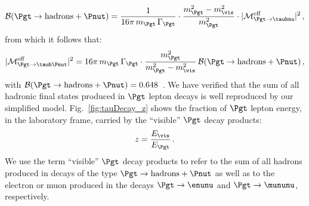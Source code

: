 \begin{equation}
\mathcal{B}(\Pgt \to \textrm{hadrons} + \Pnut) = \frac{1}{16 \pi \, m_{\Pgt} \, \Gamma_{\Pgt}} \cdot \frac{m_{\Pgt}^{2} - m_{\vis}^{2}}{m_{\Pgt}^{2}} \cdot \vert \mathcal{M}^{\textrm{eff}}_{\Pgt \to
  \tauhnu} \vert^{2} \, ,
\end{equation}
from which it follows that:
\begin{equation}
\vert \mathcal{M}^{\textrm{eff}}_{\Pgt \to \tauh\Pnut} \vert^{2} = 16 \pi \, m_{\Pgt} \, \Gamma_{\Pgt} 
  \cdot \frac{m_{\Pgt}^{2}}{m_{\Pgt}^{2} - m_{\vis}^{2}} \, \mathcal{B}(\Pgt \to \textrm{hadrons} + \Pnut) \, , 
\end{equation}
with $\mathcal{B}(\Pgt \to \textrm{hadrons} + \Pnut) = 0.648$~\cite{PDG}.
We have verified that the sum of all hadronic final states produced in $\Pgt$ lepton decays
is well reproduced by our simplified model.
Fig.~\ref{fig:tauDecay_z} shows the fraction of $\Pgt$ lepton energy,
in the laboratory frame, carried by the ``visible'' $\Pgt$ decay
products:
\begin{equation}
z = \frac{E_{\vis}}{E_{\Pgt}} \, .
\label{eq:def_z}
\end{equation}
We use the term ``visible'' $\Pgt$ decay products to refer to the sum
of all hadrons produced in decays of the type $\Pgt \to \textrm{hadrons} + \Pnut$ 
as well as to the electron or muon produced in the decays $\Pgt \to \enunu$ and $\Pgt \to \mununu$, respectively.


